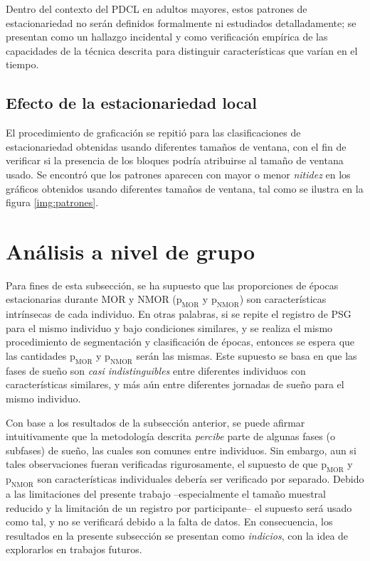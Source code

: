 \documentclass[12pt,letterpaper]{book}
\begin{document}
Dentro del contexto del PDCL en adultos mayores, estos patrones de estacionariedad no serán definidos formalmente ni estudiados detalladamente; se presentan como un hallazgo incidental y como verificación empírica de las capacidades de la técnica descrita para distinguir características que varían en el tiempo.


\subsection*{Efecto de la estacionariedad local}

El procedimiento de graficación se repitió para las clasificaciones de estacionariedad obtenidas usando diferentes tamaños de ventana, con el fin de verificar si la presencia de los bloques podría atribuirse al tamaño de ventana usado.
%
Se encontró que los patrones aparecen con mayor o menor \textit{nitidez} en los gráficos obtenidos usando diferentes tamaños de ventana, tal como se ilustra en la figura \ref{img:patrones}.


\section{Análisis a nivel de grupo}

Para fines de esta subsección, se ha supuesto que las proporciones de épocas estacionarias durante MOR y NMOR ($\text{p}_{\text{MOR}}$ y $\text{p}_{\text{NMOR}}$) son características intrínsecas de cada individuo. 
%
En otras palabras, si se repite el registro de PSG para el mismo individuo y bajo condiciones similares, y se realiza el mismo procedimiento de segmentación y clasificación de épocas, entonces se espera que las cantidades $\text{p}_{\text{MOR}}$ y $\text{p}_{\text{NMOR}}$ serán las mismas.
%
Este supuesto se basa en que las fases de sueño son \textit{casi indistinguibles} entre diferentes individuos con características similares, y más aún entre diferentes jornadas de sueño para el mismo individuo.

Con base a los resultados de la subsección anterior, se puede afirmar intuitivamente que la metodología descrita \textit{percibe} parte de algunas fases (o subfases) de sueño, las cuales son comunes entre individuos.
%
Sin embargo, aun si tales observaciones fueran verificadas rigurosamente, el supuesto de que $\text{p}_{\text{MOR}}$ y $\text{p}_{\text{NMOR}}$ son características individuales debería ser verificado por separado.
%
Debido a las limitaciones del presente trabajo --especialmente el tamaño muestral reducido y la limitación de un registro por participante-- el supuesto será usado como tal, y no se verificará debido a la falta de datos.
%
En consecuencia, los resultados en la presente subsección se presentan como \textit{indicios}, con la idea de explorarlos en trabajos futuros.
\end{document}
